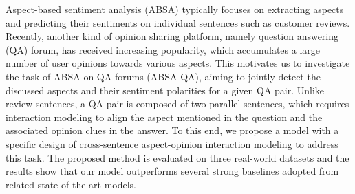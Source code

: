 Aspect-based sentiment analysis (ABSA) typically focuses on extracting aspects and predicting their sentiments on individual sentences such as customer reviews. Recently, another kind of opinion sharing platform, namely question answering (QA) forum, has received increasing popularity, which accumulates a large number of user opinions towards various aspects. This motivates us to investigate the task of ABSA on QA forums (ABSA-QA), aiming to jointly detect the discussed aspects and their sentiment polarities for a given QA pair. Unlike review sentences, a QA pair is composed of two parallel sentences, which requires interaction modeling to align the aspect mentioned in the question and the associated opinion clues in the answer. To this end, we propose a model with a specific design of cross-sentence aspect-opinion interaction modeling to address this task. The proposed method is evaluated on three real-world datasets and the results show that our model outperforms several strong baselines adopted from related state-of-the-art models.
